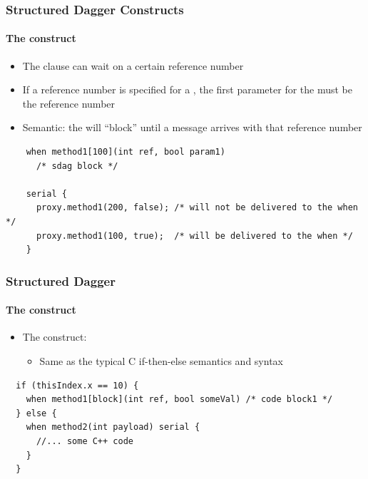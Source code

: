 
\begin{frame}[fragile]
  \frametitle{Structured Dagger Constructs}
  \framesubtitle{The  construct}
  \begin{itemize}
    \item The  clause can wait on a certain reference number
    \item If a reference number is specified for a , the first
      parameter for the  must be the reference number
    \item Semantic: the  will ``block'' until a message arrives with
      that reference number
  \end{itemize}
  \begin{lstlisting}
    when method1[100](int ref, bool param1)
      /* sdag block */

    serial {
      proxy.method1(200, false); /* will not be delivered to the when */
      proxy.method1(100, true);  /* will be delivered to the when */
    }
  \end{lstlisting}
\end{frame}

\begin{frame}[fragile]
  \frametitle{Structured Dagger}
  \framesubtitle{The  construct}
  \begin{itemize}
  \item The  construct:
    \begin{itemize}
    \item Same as the typical C if-then-else semantics and syntax
    \end{itemize}
  \end{itemize}
  \begin{lstlisting}
  if (thisIndex.x == 10) {
    when method1[block](int ref, bool someVal) /* code block1 */
  } else {
    when method2(int payload) serial {
      //... some C++ code
    }
  }
  \end{lstlisting}
\end{frame}

